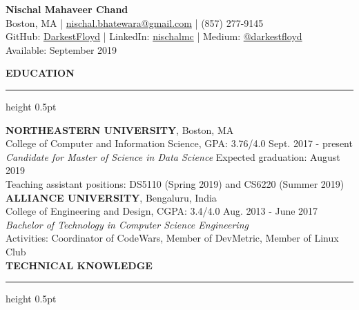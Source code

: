 \documentclass[a4paper]{article}
\newcommand{\myline}{\par
  \kern2pt %
  \hrule height 0.5pt
  \kern2pt %
}
\begin{document}
	\begin{center}
		{\Large \textbf{Nischal Mahaveer Chand}} \\
    Boston, MA | \href{mailto:nischal.bhatewara@gmail.com}{nischal.bhatewara@gmail.com} | 
    (857) 277-9145 \\
                GitHub: \href{https://github.com/DarkestFloyd}{DarkestFloyd} | 
                LinkedIn: \href{https://www.linkedin.com/in/nischalmc}{nischalmc} |
		Medium: \href{https://medium.com/@darkestfloyd}{@darkestfloyd} \\
		Available: September 2019 \\
	\end{center}
	
	\noindent
	{\large \textbf{EDUCATION}}
	\myline 
	\smallskip
	
	\noindent
	\textbf{NORTHEASTERN UNIVERSITY}, Boston, MA \\
	College of Computer and Information Science, GPA: 3.76/4.0 
        \hfill Sept. 2017 - present \\
	\textit{Candidate for Master of Science in Data Science} 
        \hfill Expected graduation: August 2019 \\
  Teaching assistant positions: DS5110 (Spring 2019) and CS6220 (Summer 2019) \\

	\noindent
	\textbf{ALLIANCE UNIVERSITY}, Bengaluru, India \\
  College of Engineering and Design, CGPA: 3.4/4.0 \hfill Aug. 2013 - June 2017 \\
	\textit{Bachelor of Technology in Computer Science Engineering} \\
	Activities: Coordinator of CodeWars, Member of DevMetric, Member of Linux 
        Club \\
	
	\noindent
	{\large \textbf{TECHNICAL KNOWLEDGE}}
	\myline 
	
\end{document}
